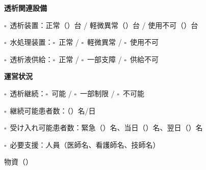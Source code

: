 \documentclass[a4paper,12pt]{jarticle}
\newcommand{\checkbox}{$\square$\ }
\newcommand{\underlinespace}[1]{\underline{\hspace{#1}}}
\begin{document}
\vspace{8mm}

\begin{center}
\textbf{\large 透析関連設備}
\end{center}

\vspace{3mm}

\noindent
\checkbox 透析装置：正常（\underlinespace{1.5cm}）台 \quad / \quad 軽微異常（\underlinespace{1.5cm}）台 \quad / \quad 使用不可（\underlinespace{1.5cm}）台

\vspace{3mm}

\noindent
\checkbox 水処理装置：\quad \checkbox 正常 \quad / \quad \checkbox 軽微異常 \quad / \quad \checkbox 使用不可

\vspace{3mm}

\noindent
\checkbox 透析液供給：\quad \checkbox 正常 \quad / \quad \checkbox 一部支障 \quad / \quad \checkbox 供給不可

\vspace{8mm}

\begin{center}
\textbf{\large 運営状況}
\end{center}

\vspace{3mm}

\noindent
\checkbox 透析継続：\quad \checkbox 可能 \quad / \quad \checkbox 一部制限 \quad / \quad \checkbox 不可能

\vspace{3mm}

\noindent
\checkbox 継続可能患者数：（\underlinespace{2cm}）名/日

\vspace{3mm}

\noindent
\checkbox 受け入れ可能患者数：緊急（\underlinespace{1.5cm}）名、当日（\underlinespace{1.5cm}）名、翌日（\underlinespace{1.5cm}）名

\vspace{3mm}

\noindent
\checkbox 必要支援：人員（医師\underlinespace{1cm}名、看護師\underlinespace{1cm}名、技師\underlinespace{1cm}名）

\vspace{2mm}

\hspace*{3.5cm}物資（\underlinespace{8cm}）

\vspace{2mm}
\end{document}
